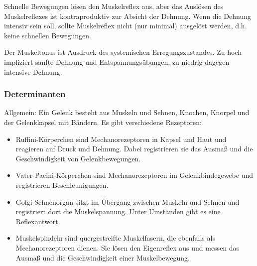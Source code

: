 Schnelle Bewegungen lösen den Muskelreflex aus, aber das Auslösen des Muskelreflexes ist kontraproduktiv zur Absicht der Dehnung. Wenn die Dehnung intensiv sein soll, sollte Muskelreflex nicht (nur minimal) ausgelöst werden, d.h. keine schnellen Bewegungen.

Der Muskeltonus ist Ausdruck des systemischen Erregungszustandes. Zu hoch impliziert sanfte Dehnung und Entspannungsübungen, zu niedrig dagegen intensive Dehnung.

\subsubsection*{Determinanten}

Allgemein:
Ein Gelenk besteht aus Muskeln und Sehnen, Knochen, Knorpel und der Gelenkkapsel mit Bändern.
Es gibt verschiedene Rezeptoren:
\begin{itemize}
    \item Ruffini-Körperchen sind Mechanorezeptoren in Kapsel und Haut und reagieren auf Druck und Dehnung. Dabei registrieren sie das Ausmaß und die Geschwindigkeit von Gelenkbewegungen.
    \item Vater-Pacini-Körperchen sind Mechanorezeptoren im Gelenkbindegewebe und registrieren Beschleunigungen.
    \item Golgi-Sehnenorgan sitzt im Übergang zwischen Muskeln und Sehnen und registriert dort die Muskelspannung. Unter Umständen gibt es eine Reflexantwort.
    \item Muskelspindeln sind quergestreifte Muskelfasern, die ebenfalls als Mechanorezeptoren dienen. Sie lösen den Eigenreflex aus und messen das Ausmaß und die Geschwindigkeit einer Muskelbewegung.
\end{itemize}

